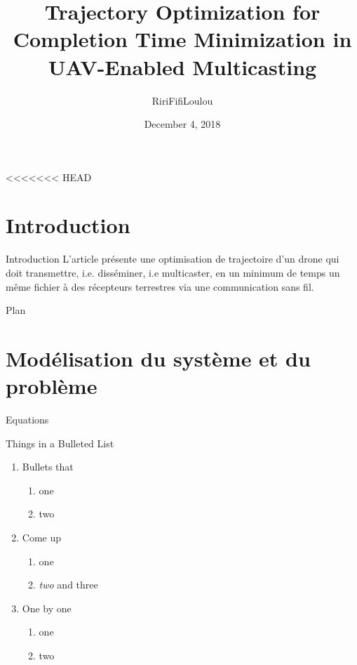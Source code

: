 \documentclass[utf8, a4paper]{beamer}
\title
  [Optimisation de trajectoire et du temps de mission d'un drone de télécommunication multicast.]
  {Trajectory Optimization for Completion Time Minimization in UAV-Enabled Multicasting}
\author
  [Toto]
  {Riri\quad Fifi\quad Loulou }
\date
  {December 4, 2018}
\institute
  {ENAC}
\begin{document}
<<<<<<< HEAD
\maketitle



\section {Introduction}

\begin{frame}
  {Introduction}
  L'article présente une optimisation de trajectoire d'un drone qui doit transmettre, i.e. disséminer, i.e multicaster,
  en un minimum de temps un même fichier à des récepteurs terrestres via une communication sans fil.

\end{frame}

\begin{frame}{Plan}
 \tableofcontents
\end{frame}

\section{Modélisation du système et du problème}

\begin{frame}{Equations}

 Things in a Bulleted List\pause

\begin{enumerate}
	\item Bullets that
	\begin{enumerate}
		\item one
		\item two
	\end{enumerate}\pause
	\item Come up
	\begin{enumerate}
		\item one
		\item \emph{two} and three
	\end{enumerate}\pause
	\item One by one
	\begin{enumerate}
		\item one
		\item two
	\end{enumerate}
\end{enumerate}
\end{frame}
\end{document}
